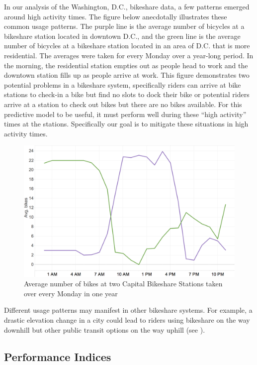 \documentclass{acm_proc_article-sp}
\begin{document}
In our analysis of the Washington, D.C., bikeshare data, a few patterns emerged around high activity times. The figure below anecdotally illustrates these common usage patterns. The purple line is the average number of bicycles at a bikeshare station located in downtown D.C., and the green line is the average number of bicycles at a bikeshare station located in an area of D.C. that is more residential. The averages were taken for every Monday over a year-long period. In the morning, the residential station empties out as people head to work and the downtown station fills up as people arrive at work. This figure demonstrates two potential problems in a bikeshare system, specifically riders can arrive at bike stations to check-in a bike but find no slots to dock their bike or potential riders arrive at a station to check out bikes but there are no bikes available.  For this predictive model to be useful, it must perform well during these ``high activity'' times at the stations. Specifically our goal is to mitigate these situations in high activity times.

\begin{figure} [!h]
\caption{Average number of bikes at two Capital Bikeshare Stations taken over every Monday in one year}
\centering
\includegraphics[scale = 0.35]{stations_over_time.png}
\end{figure}

Different usage patterns may manifest in other bikeshare systems. For example, a drastic elevation change in a city could lead to riders using bikeshare on the way downhill but other public transit options on the way uphill (see \cite{lin:chou}).
\vspace{0.5cm}

\subsection{Performance Indices}
\end{document}

